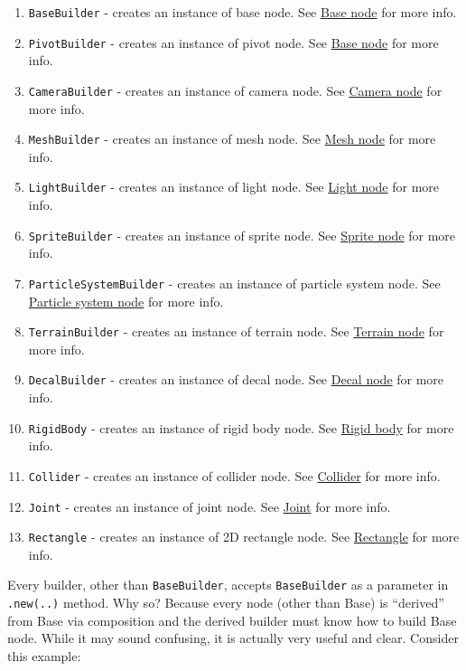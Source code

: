 \documentclass[
]{book}
\providecommand{\tightlist}{%
  \setlength{\itemsep}{0pt}\setlength{\parskip}{0pt}}
\theoremstyle{definition}
\theoremstyle{definition}
\theoremstyle{definition}
\theoremstyle{definition}
\theoremstyle{remark}
\begin{document}
\begin{enumerate}
\def\labelenumi{\arabic{enumi})}
\tightlist
\item
  \texttt{BaseBuilder} - creates an instance of base node. See \href{./base_node.md}{Base node} for more info.
\item
  \texttt{PivotBuilder} - creates an instance of pivot node. See \href{./base_node.md}{Base node} for more info.
\item
  \texttt{CameraBuilder} - creates an instance of camera node. See \href{./camera_node.md}{Camera node} for more info.
\item
  \texttt{MeshBuilder} - creates an instance of mesh node. See \href{./mesh_node.md}{Mesh node} for more info.
\item
  \texttt{LightBuilder} - creates an instance of light node. See \href{./light_node.md}{Light node} for more info.
\item
  \texttt{SpriteBuilder} - creates an instance of sprite node. See \href{./sprite_node.md}{Sprite node} for more info.
\item
  \texttt{ParticleSystemBuilder} - creates an instance of particle system node. See \href{./particle_system_node.md}{Particle system node} for more info.
\item
  \texttt{TerrainBuilder} - creates an instance of terrain node. See \href{./terrain_node.md}{Terrain node} for more info.
\item
  \texttt{DecalBuilder} - creates an instance of decal node. See \href{./decal_node.md}{Decal node} for more info.
\item
  \texttt{RigidBody} - creates an instance of rigid body node. See \href{../physics/rigid_body.md}{Rigid body} for more info.
\item
  \texttt{Collider} - creates an instance of collider node. See \href{../physics/collider.md}{Collider} for more info.
\item
  \texttt{Joint} - creates an instance of joint node. See \href{../physics/joint.md}{Joint} for more info.
\item
  \texttt{Rectangle} - creates an instance of 2D rectangle node. See \href{./rectangle.md}{Rectangle} for more info.
\end{enumerate}

Every builder, other than \texttt{BaseBuilder}, accepts \texttt{BaseBuilder} as a parameter in \texttt{.new(..)} method. Why so? Because every node (other than Base) is ``derived'' from Base via composition and the derived builder must know how to build Base node. While it may sound confusing, it is actually very useful and clear. Consider this example:
\end{document}

